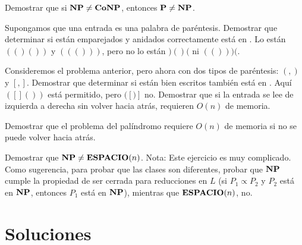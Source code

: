 \begin{ejercicio}
    Demostrar que si $\textbf{NP} \neq \textbf{CoNP}$, entonces $\textbf{P} \neq \textbf{NP}$.
\end{ejercicio}

\begin{ejercicio}
    Supongamos que una entrada es una palabra de paréntesis. Demostrar que determinar si están emparejados y anidados correctamente está en \Loga. Lo están $(()())$ y $((()))$, pero no lo están $)()($ ni $(()))($.
\end{ejercicio}

\begin{ejercicio}
    Consideremos el problema anterior, pero ahora con dos tipos de paréntesis: $(,)$ y $[,]$. Demostrar que determinar si están bien escritos 
    también está en \Loga. Aquí $([]())$ está permitido, pero $([)]$ no. Demostrar que si la entrada se lee de izquierda a derecha sin volver hacia atrás, 
    requieren $O(n)$ de memoria.
\end{ejercicio}

\begin{ejercicio}
    Demostrar que el problema del palíndromo requiere $O(n)$ de memoria si no se puede volver hacia atrás.
\end{ejercicio}

\begin{ejercicio}
    Demostrar que $\textbf{NP} \neq \textbf{ESPACIO}(n)$. Nota: Este ejercicio es muy complicado. Como sugerencia, para probar que 
    las clases son diferentes, probar que $\textbf{NP}$ cumple la propiedad de ser cerrada para reducciones en $L$ 
    (si $P_1 \propto P_2$ y $P_2$ está en $\textbf{NP}$, entonces $P_1$ está en $\textbf{NP}$), mientras que $\textbf{ESPACIO}(n)$, no.
\end{ejercicio}

\newpage
\section{Soluciones}
\setcounter{ejercicio}{0}

